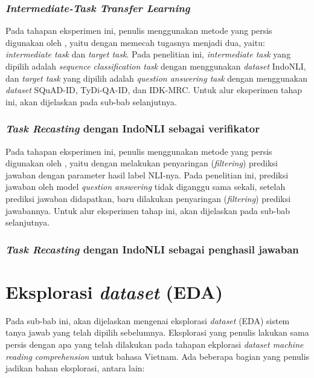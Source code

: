 \subsubsection{\emph{Intermediate-Task Transfer Learning}}
Pada tahapan eksperimen ini, penulis menggunakan metode yang persis digunakan oleh \citep{pruksachatkun-etal-2020-intermediate}, yaitu dengan memecah tugasnya menjadi dua, yaitu: \emph{intermediate task} dan \emph{target task}. Pada penelitian ini, \emph{intermediate task} yang dipilih adalah \emph{sequence classification task} dengan menggunakan \emph{dataset} IndoNLI, dan \emph{target task} yang dipilih adalah \emph{question answering task} dengan menggunakan \emph{dataset} SQuAD-ID, TyDi-QA-ID, dan IDK-MRC. Untuk alur eksperimen tahap ini, akan dijelaskan pada sub-bab selanjutnya.

\subsubsection{\emph{Task Recasting} dengan IndoNLI sebagai verifikator}
Pada tahapan eksperimen ini, penulis menggunakan metode yang persis digunakan oleh \citep{chen-etal-2021-nli-models}, yaitu dengan melakukan penyaringan (\emph{filtering}) prediksi jawaban dengan parameter hasil label NLI-nya. Pada penelitian ini, prediksi jawaban oleh model \emph{question answering} tidak diganggu sama sekali, setelah prediksi jawaban didapatkan, baru dilakukan penyaringan (\emph{filtering}) prediksi jawabannya. Untuk alur eksperimen tahap ini, akan dijelaskan pada sub-bab selanjutnya. 

\subsubsection{\emph{Task Recasting} dengan IndoNLI sebagai penghasil jawaban}
\todo

\section{Eksplorasi \emph{dataset} (EDA)}
Pada sub-bab ini, akan dijelaskan mengenai eksplorasi \emph{dataset} (EDA) sistem tanya jawab yang telah dipilih sebelumnya. Eksplorasi yang penulis lakukan sama persis dengan apa yang telah dilakukan \citet{nguyen-etal-2020-vietnamese} pada tahapan ekplorasi \emph{dataset machine reading comprehension} untuk bahasa Vietnam. Ada beberapa bagian yang penulis jadikan bahan eksplorasi, antara lain:

